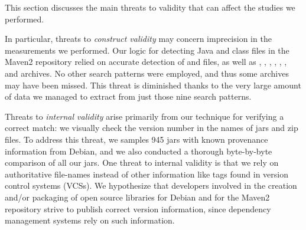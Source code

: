 This section discusses the main threats to validity that can affect the
studies we performed. 

In particular, threats to {\em construct validity} may concern imprecision
in the measurements we performed. Our logic for detecting Java and class
files in the Maven2 repository relied on accurate detection of
 and  files, as well as ,
, , 
, , , and 
archives.  No other search patterns were employed, and thus some archives
may have been missed.  This threat is diminished thanks to the very large
amount of data we managed to extract from just those nine search patterns.


Threats to {\em internal validity} arise primarily from our technique for
verifying a correct match: we visually check the version number in the
names of jars and zip files.  To address this threat, we samples 945 jars
with known provenance information from Debian, and we also conducted a
thorough byte-by-byte comparison of all our jars.
One threat to internal validity is that we rely on authoritative file-names
instead of other information like tags found in version control systems
(VCSs).
We hypothesize that developers involved in the creation and/or packaging of
open source libraries for Debian and for the Maven2 repository strive to
publish correct version information, since dependency management systems
rely on such information.


